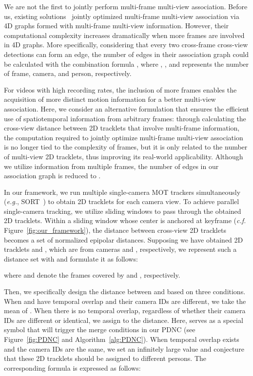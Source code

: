 \documentclass{CVM}
\newcommand{\eg}{{\it e.g.}}
\begin{document}
We are not the first to jointly perform multi-frame multi-view association. Before us, existing solutions~\cite{leal2012branch,zhang20204d} jointly optimized multi-frame multi-view association via 4D graphs formed with multi-frame multi-view information. However, their computational complexity increases dramatically when more frames are involved in 4D graphs. More specifically, considering that every two cross-frame cross-view detections can form an edge, the number of edges in their association graph could be calculated with the combination formula , where , , and  represents the number of frame, camera, and person, respectively. 

For videos with high recording rates, the inclusion of more frames enables the acquisition of more distinct motion information for a better multi-view association. Here, we consider an alternative formulation that ensures the efficient use of spatiotemporal information from arbitrary frames: through calculating the cross-view distance between 2D tracklets that involve multi-frame information, the computation required to jointly optimize multi-frame multi-view association is no longer tied to the complexity of frames, but it is only related to the number of multi-view 2D tracklets, thus improving its real-world applicability. Although we utilize information from multiple frames, the number of edges in our association graph is reduced to .





In our framework, we run multiple single-camera MOT trackers simultaneously (\eg, SORT~\cite{Bewley2016_sort}) to obtain 2D tracklets for each camera view.
To achieve parallel single-camera tracking, we utilize sliding windows to pass through the obtained 2D tracklets. Within a sliding window whose center is anchored at keyframe  (\textit{c.f.} Figure~\ref{fig:our_framework}), the distance between cross-view 2D tracklets becomes a set of normalized epipolar distances. Supposing we have obtained 2D tracklets  and , which are from cameras  and , respectively, we represent such a distance set with  and formulate it as follows:

where  and  denote the frames covered by   and , respectively.

Then, we specifically design the distance between  and  based on three conditions. When  and  have temporal overlap and their camera IDs are different, we take the mean of . When there is no temporal overlap, regardless of whether their camera IDs are different or identical, we assign   to the distance. Here,  serves as a special symbol that will trigger the merge conditions in our PDNC (see Figure~\ref{fig:PDNC} and Algorithm~\ref{alg:PDNC}). When temporal overlap exists and the camera IDs are the same, we set an infinitely large value and conjecture that these 2D tracklets should be assigned to different persons. The corresponding formula is expressed as follows:
\begin{small}

\end{small}
\end{document}
